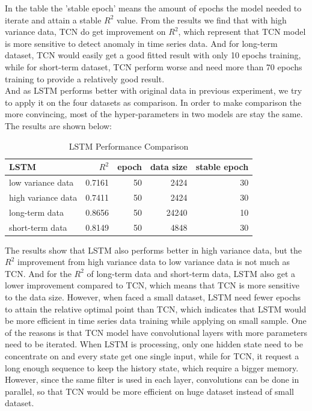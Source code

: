 In the table the 'stable epoch' means the amount of epochs the model needed to iterate and attain a stable $R^2$ value. From the results we find that with high variance data, TCN do get improvement on $R^2$, which represent that TCN model is more sensitive to detect anomaly in time series data. And for long-term dataset, TCN would easily get a good fitted result with only 10 epochs training, while for short-term dataset, TCN perform worse and need more than 70 epochs training to provide a relatively good result.\\
And as LSTM performs better with original data in previous experiment, we try to apply it on the four datasets as comparison. In order to make comparison the more convincing, most of the hyper-parameters in two models are stay the same. The results are shown below:
\begin{table}[H]
\centering
\caption{LSTM Performance Comparison}
\begin{tabular}{l r r r r}
\toprule
\textbf{LSTM} & \textbf{$R^2$} & \textbf{epoch} & \textbf{data size}& \textbf{stable epoch}\\
\midrule
low variance data & 0.7161& 50& 2424& 30\\
high variance data & 0.7411& 50& 2424& 30 \\
long-term data& 0.8656& 50& 24240& 10 \\
short-term data& 0.8149& 50& 4848& 30 \\
\bottomrule
\end{tabular}
\label{tab:LSTM}
\end{table}
The results show that LSTM also performs better in high variance data, but the $R^2$ improvement from high variance data to low variance data is not much as TCN. And for the $R^2$ of long-term data and short-term data, LSTM also get a lower improvement compared to TCN, which means that TCN is more sensitive to the data size. However, when faced a small dataset, LSTM need fewer epochs to attain the relative optimal point than TCN, which indicates that LSTM would be more efficient in time series data training while applying on small sample. One of the reasons is that TCN model have convolutional layers with more parameters need to be iterated. When LSTM is processing, only one hidden state need to be concentrate on and every state get one single input, while for TCN, it request a long enough sequence to keep the history state, which require a bigger memory. However, since the same filter is used in each layer, convolutions can be done in parallel, so that TCN would be more efficient on huge dataset instead of small dataset. 
